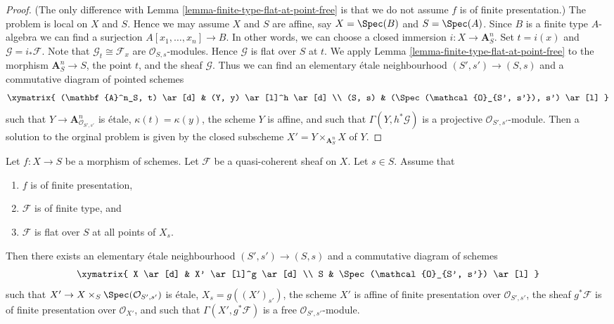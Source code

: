 \begin{proof}
(The only difference with
Lemma \ref{lemma-finite-type-flat-at-point-free}
is that we do not assume $f$ is of finite presentation.)
The problem is local on $X$ and $S$. Hence we may assume $X$ and
$S$ are affine, say $X = \Spec(B)$ and $S = \Spec(A)$.
Since $B$ is a finite type $A$-algebra we can find a surjection
$A[x_1, \ldots, x_n] \to B$. In other words, we can choose a closed
immersion $i : X \to \mathbf{A}^n_S$. Set $t = i(x)$ and
$\mathcal{G} = i_*\mathcal{F}$. Note that $\mathcal{G}_t \cong \mathcal{F}_x$
are $\mathcal{O}_{S, s}$-modules. Hence $\mathcal{G}$ is flat over $S$ at $t$.
We apply
Lemma \ref{lemma-finite-type-flat-at-point-free}
to the morphism $\mathbf{A}^n_S \to S$, the point $t$, and the
sheaf $\mathcal{G}$. Thus we can find an
elementary \'etale neighbourhood $(S', s') \to (S, s)$
and a commutative diagram of pointed schemes
$$
\xymatrix{
(\mathbf{A}^n_S, t) \ar[d] & (Y, y) \ar[l]^h \ar[d] \\
(S, s) & (\Spec(\mathcal{O}_{S', s'}), s') \ar[l]
}
$$
such that $Y \to \mathbf{A}^n_{\mathcal{O}_{S', s'}}$
is \'etale, $\kappa(t) = \kappa(y)$, the scheme $Y$ is
affine, and such that $\Gamma(Y, h^*\mathcal{G})$ is a projective
$\mathcal{O}_{S', s'}$-module. Then a solution to the orginal
problem is given by the closed subscheme
$X' = Y \times_{\mathbf{A}^n_S} X$ of $Y$.
\end{proof}

\begin{lemma}
\label{lemma-finite-type-flat-along-fibre-free}
Let $f : X \to S$ be a morphism of schemes.
Let $\mathcal{F}$ be a quasi-coherent sheaf on $X$.
Let $s \in S$.
Assume that
\begin{enumerate}
\item $f$ is of finite presentation,
\item $\mathcal{F}$ is of finite type, and
\item $\mathcal{F}$ is flat over $S$ at all points of $X_s$.
\end{enumerate}
Then there exists an elementary \'etale neighbourhood $(S', s') \to (S, s)$
and a commutative diagram of schemes
$$
\xymatrix{
X \ar[d] & X' \ar[l]^g \ar[d] \\
S & \Spec(\mathcal{O}_{S', s'}) \ar[l]
}
$$
such that $X' \to X \times_S \Spec(\mathcal{O}_{S', s'})$
is \'etale, $X_s = g((X')_{s'})$, the scheme $X'$ is
affine of finite presentation over $\mathcal{O}_{S', s'}$,
the sheaf $g^*\mathcal{F}$ is of finite presentation over $\mathcal{O}_{X'}$,
and such that $\Gamma(X', g^*\mathcal{F})$ is a free
$\mathcal{O}_{S', s'}$-module.
\end{lemma}

